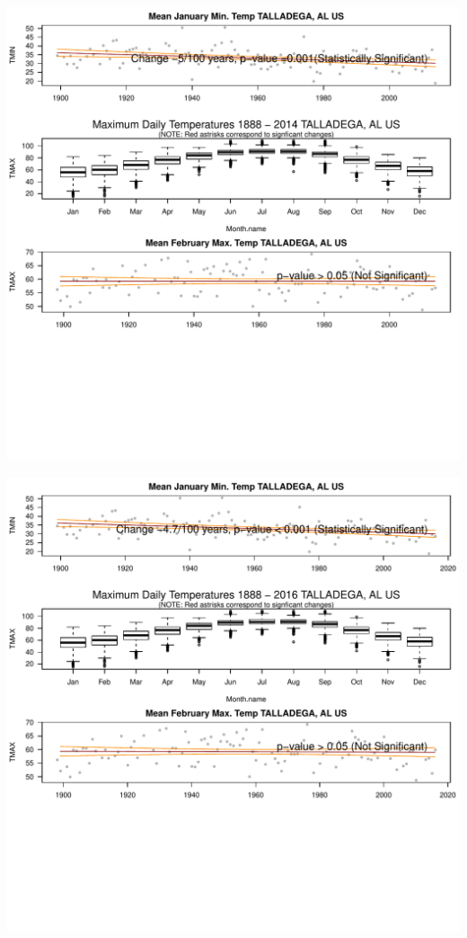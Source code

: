 \documentclass{article}\usepackage[]{graphicx}\usepackage[]{color}
\makeatletter
\def\maxwidth{ %
  \ifdim\Gin@nat@width>\linewidth
    \linewidth
  \else
    \Gin@nat@width
  \fi
}
\newenvironment{knitrout}{}{} %
\makeatother
\begin{document}
\begin{knitrout}
\includegraphics[width=\maxwidth]{figure/static_template-53} 

\includegraphics[width=\maxwidth]{figure/static_template-54} 


\end{knitrout}
\end{document}
